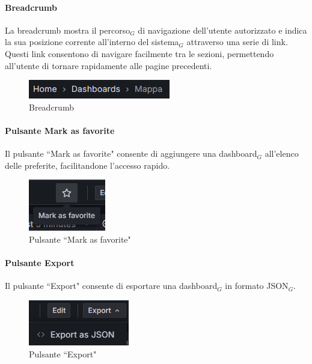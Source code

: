 \documentclass[10pt]{article}
\begin{document}
\begin{justify}
    \paragraph{Breadcrumb}
    La breadcrumb mostra il percorso$_G$ di navigazione dell'utente autorizzato e indica la sua posizione corrente all'interno del sistema$_G$ attraverso una serie di link. Questi link consentono di navigare facilmente tra le sezioni, permettendo all'utente di tornare rapidamente alle pagine precedenti.
    \begin{figure}[H]
    \centering
    \includegraphics[width=0.35\linewidth]{breadcrumb.png}
    \caption{Breadcrumb}
    \end{figure}

    \paragraph{Pulsante Mark as favorite}
    Il pulsante ``Mark as favorite" consente di aggiungere una dashboard$_G$ all'elenco delle preferite, facilitandone l'accesso rapido.
    \begin{figure}[H]
    \centering
    \includegraphics[width=0.18\linewidth]{favorite.png}
    \caption{Pulsante ``Mark as favorite"}
    \end{figure}

    \paragraph{Pulsante Export}
    Il pulsante ``Export" consente di esportare una dashboard$_G$ in formato JSON$_G$.
    \begin{figure}[H]
    \centering
    \includegraphics[width=0.2\linewidth]{export.png}
    \caption{Pulsante ``Export"}
    \end{figure}


\end{justify}
\end{document}
